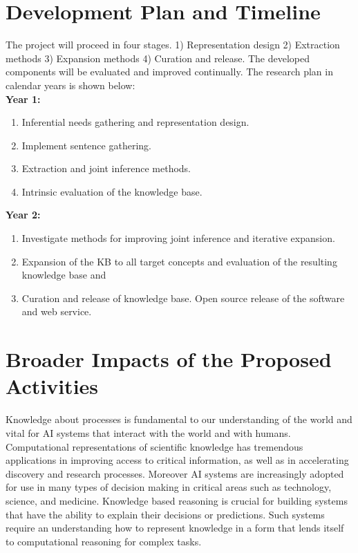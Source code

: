 \section{Development Plan and Timeline}

The project will proceed in four stages. 1) Representation design 2) Extraction methods 3) Expansion methods 4) Curation and release. The developed components will be evaluated and improved continually. The research plan in calendar years is shown below:\\
{\bf Year 1: }
\begin{enumerate}
\item Inferential needs gathering and representation design.
\item Implement sentence gathering. 
\item Extraction and joint inference methods.
\item Intrinsic evaluation of the knowledge base.
\end{enumerate}
{\bf Year 2:}
\begin{enumerate}
\item Investigate methods for improving joint inference and iterative expansion.
\item Expansion of the KB to all target concepts and evaluation of the resulting knowledge base and 
\item Curation and release of knowledge base. Open source release of the software and web service.
\end{enumerate}
\vspace{-1em}

\section{Broader Impacts of the Proposed Activities}

Knowledge about processes is fundamental to our understanding of the world and vital for AI systems that interact with the world and with humans.  Computational representations of scientific knowledge has tremendous applications in improving access to critical information, as well as in accelerating discovery and research processes. Moreover AI systems are increasingly adopted for use in many types of decision making in critical areas such as technology, science, and medicine. Knowledge based reasoning is crucial for building systems that have the ability to explain their decisions or predictions. Such systems require an understanding how to represent knowledge in a form that lends itself to computational reasoning for complex tasks.

